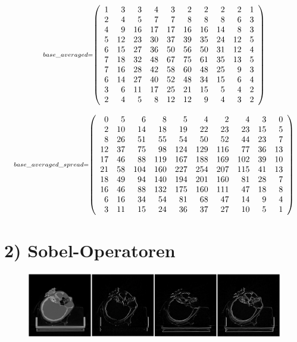 \documentclass[11pt]{article}
\makeatletter
\def\maxwidth{\ifdim\Gin@nat@width>\linewidth\linewidth
    \else\Gin@nat@width\fi}
\let\Oldincludegraphics\includegraphics
\renewcommand{\includegraphics}[1]{\Oldincludegraphics[width=.8\maxwidth]{#1}}
\makeatother
\begin{document}
    
    \[\scriptstyle base\_averaged =  \def\g{\color{lightgray}}\left(\begin{array}{rrrrrrrrrr}1 & 3 & 3 & 4 & 3 & 2 & 2 & 2 & 2 & 1\\2 & 4 & 5 & 7 & 7 & 8 & 8 & 8 & 6 & 3\\4 & 9 & 16 & 17 & 17 & 16 & 16 & 14 & 8 & 3\\5 & 12 & 23 & 30 & 37 & 39 & 35 & 24 & 12 & 5\\6 & 15 & 27 & 36 & 50 & 56 & 50 & 31 & 12 & 4\\7 & 18 & 32 & 48 & 67 & 75 & 61 & 35 & 13 & 5\\7 & 16 & 28 & 42 & 58 & 60 & 48 & 25 & 9 & 3\\6 & 14 & 27 & 40 & 52 & 48 & 34 & 15 & 6 & 4\\3 & 6 & 11 & 17 & 25 & 21 & 15 & 5 & 4 & 2\\2 & 4 & 5 & 8 & 12 & 12 & 9 & 4 & 3 & 2\end{array}\right)\]

    
    \[\scriptstyle base\_averaged\_spread =  \def\g{\color{lightgray}}\left(\begin{array}{rrrrrrrrrr}0 & 5 & 6 & 8 & 5 & 4 & 2 & 4 & 3 & 0\\2 & 10 & 14 & 18 & 19 & 22 & 23 & 23 & 15 & 5\\8 & 26 & 51 & 55 & 54 & 50 & 52 & 44 & 23 & 7\\12 & 37 & 75 & 98 & 124 & 129 & 116 & 77 & 36 & 13\\17 & 46 & 88 & 119 & 167 & 188 & 169 & 102 & 39 & 10\\21 & 58 & 104 & 160 & 227 & 254 & 207 & 115 & 41 & 13\\18 & 49 & 94 & 140 & 194 & 201 & 160 & 81 & 28 & 7\\16 & 46 & 88 & 132 & 175 & 160 & 111 & 47 & 18 & 8\\6 & 16 & 34 & 54 & 81 & 68 & 47 & 14 & 9 & 4\\3 & 11 & 15 & 24 & 36 & 37 & 27 & 10 & 5 & 1\end{array}\right)\]

    
    \hypertarget{sobel-operatoren}{%
\section*{2) Sobel-Operatoren}\label{sobel-operatoren}}


\begin{figure}[hbt]
    \centering
    \includegraphics{beispiel_schaedel.png}
\end{figure}
\end{document}
